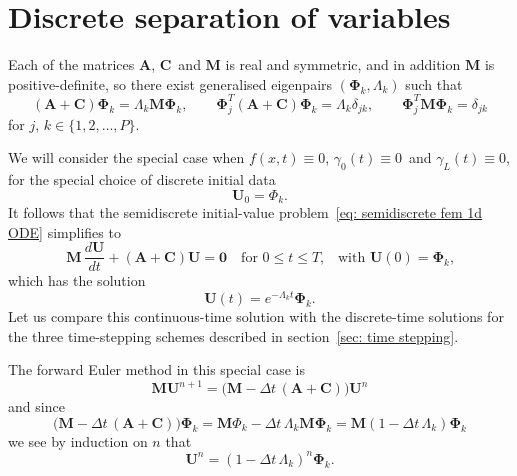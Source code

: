 \section{Discrete separation of variables}
Each of the matrices $\boldsymbol{A}$, $\boldsymbol{C}$~and $\boldsymbol{M}$ is 
real and symmetric, and in addition $\boldsymbol{M}$ is positive-definite, so 
there exist generalised eigenpairs $(\boldsymbol{\Phi}_k,\Lambda_k)$ such that 
\[
(\boldsymbol{A}+\boldsymbol{C})\boldsymbol{\Phi}_k
    =\Lambda_k\boldsymbol{M}\boldsymbol{\Phi}_k,\qquad
\boldsymbol{\Phi}_j^T(\boldsymbol{A}+\boldsymbol{C})\boldsymbol{\Phi}_k
    =\Lambda_k\delta_{jk},\qquad
\boldsymbol{\Phi}_j^T\boldsymbol{M}\boldsymbol{\Phi}_k=\delta_{jk}
\]
for $j$, $k\in\{1,2,\ldots,P\}$.

We will consider the special case when $f(x,t)\equiv0$, 
$\gamma_0(t)\equiv0$~and $\gamma_L(t)\equiv0$, for the special choice of 
discrete initial data
\[
\boldsymbol{U}_0=\Phi_k.
\]
It follows that the semidiscrete initial-value 
problem~\eqref{eq: semidiscrete fem 1d ODE} simplifies to
\[
\boldsymbol{M}\,\frac{d\boldsymbol{U}}{dt}
+(\boldsymbol{A}+\boldsymbol{C})\boldsymbol{U}=\boldsymbol{0}
    \quad\text{for $0\le t\le T$,}
    \quad\text{with $\boldsymbol{U}(0)=\boldsymbol{\Phi}_k$,}
\]
which has the solution
\begin{equation}
\boldsymbol{U}(t)=e^{-\Lambda_kt}\boldsymbol{\Phi}_k.
\end{equation}
Let us compare this continuous-time solution with the discrete-time solutions 
for the three time-stepping schemes described in 
section~\ref{sec: time stepping}.

\begin{example}
The forward Euler method in this special case is
\[
\boldsymbol{M}\boldsymbol{U}^{n+1}=\bigl(\boldsymbol{M}
-\Delta t\,(\boldsymbol{A}+\boldsymbol{C})\bigr)\boldsymbol{U}^n
\]
and since
\[
\bigl(\boldsymbol{M} 
-\Delta t\,(\boldsymbol{A}+\boldsymbol{C})\bigr)\boldsymbol{\Phi}_k
    =\boldsymbol{M}\Phi_k-\Delta t\,\Lambda_k\boldsymbol{M}\boldsymbol{\Phi}_k
    =\boldsymbol{M}(1-\Delta t\,\Lambda_k)\boldsymbol{\Phi}_k
\]
we see by induction on $n$ that
\[
\boldsymbol{U}^n=(1-\Delta t\,\Lambda_k)^n\boldsymbol{\Phi}_k.
\]
\end{example}



